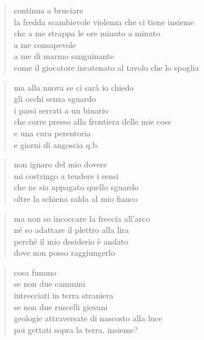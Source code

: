 \begin{poem}
\begin{poem}
\clearpage


	\begin{verse}
		continua a bruciare\\
		la fredda scambievole violenza che ci tiene insieme\\
		che a me strappa le ore minuto a minuto\\
		a me consapevole\\
		a me di marmo sanguinante\\
		come il giocatore incatenato al tavolo che lo spoglia
	\end{verse}

	\begin{verse}
		ma alla nuova se ci sarà io chiedo\\
		gli occhi senza sguardo\\
		i passi serrati a un binario\\
		che corre presso alla frontiera delle mie cose\\
		e una cura perentoria\\
		e giorni di angoscia q.b.
	\end{verse}

\clearpage


	\begin{verse}
		non ignaro del mio dovere\\
		mi costringo a tendere i sensi\\
		che ne sia appagato quello sguardo\\
		oltre la schiena salda al mio fianco
	\end{verse}

	\begin{verse}
		ma non so incoccare la freccia all'arco\\
		né so adattare il plettro alla lira\\
		perché il mio desiderio è andato\\
		dove non posso raggiungerlo
	\end{verse}

\clearpage


	\begin{verse}
		cosa fummo\\
		se non due cammini\\
		intrecciati in terra straniera\\
		se non due ruscelli giovani\\
		geologie attraversate di nascosto alla luce\\
		poi gettati sopra la terra, insieme?
	\end{verse}


\end{poem}
\end{poem}
